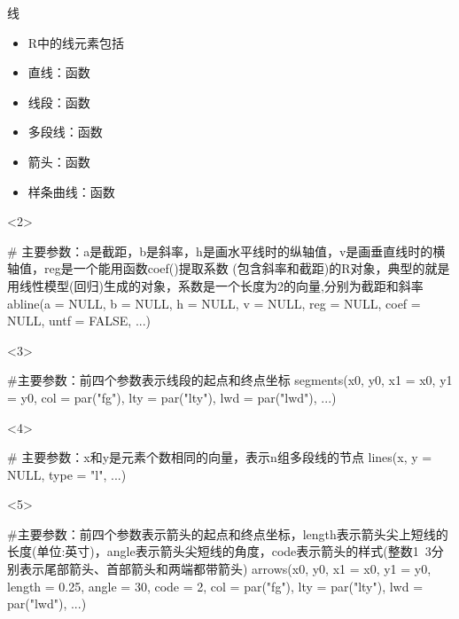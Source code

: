 \begin{frame}[t,fragile]{\subsecname}{线}
\begin{itemize}
\item<1-> R中的线元素包括
\item<2-> 直线：函数
\item<3-> 线段：函数
\item<4-> 多段线：函数
\item<5-> 箭头：函数
\item<6-> 样条曲线：函数
\end{itemize}

\begin{onlyenv}<2>
\begin{rcode}
# 主要参数：a是截距，b是斜率，h是画水平线时的纵轴值，v是画垂直线时的横轴值，reg是一个能用函数coef()提取系数
(包含斜率和截距)的R对象，典型的就是用线性模型(回归)生成的对象，系数是一个长度为2的向量,分别为截距和斜率
abline(a = NULL, b = NULL, h = NULL, v = NULL, reg = NULL, coef = NULL, untf = FALSE, ...)
\end{rcode}
\end{onlyenv}  

\begin{onlyenv}<3>
\begin{rcode}
#主要参数：前四个参数表示线段的起点和终点坐标
segments(x0, y0, x1 = x0, y1 = y0, col = par("fg"), lty = par("lty"), lwd = par("lwd"), ...)
\end{rcode}
\end{onlyenv} 

\begin{onlyenv}<4>
\begin{rcode}
# 主要参数：x和y是元素个数相同的向量，表示n组多段线的节点
lines(x, y = NULL, type = "l", ...)
\end{rcode}
\end{onlyenv} 

\begin{onlyenv}<5>
\begin{rcode}
#主要参数：前四个参数表示箭头的起点和终点坐标，length表示箭头尖上短线的长度(单位:英寸)，angle表示箭头尖短线的角度，code表示箭头的样式(整数1~3分别表示尾部箭头、首部箭头和两端都带箭头)
arrows(x0, y0, x1 = x0, y1 = y0, length = 0.25, angle = 30, code = 2, col = par("fg"), lty = par("lty"), lwd = par("lwd"), ...)
\end{rcode}
\end{onlyenv} 


\end{frame}
